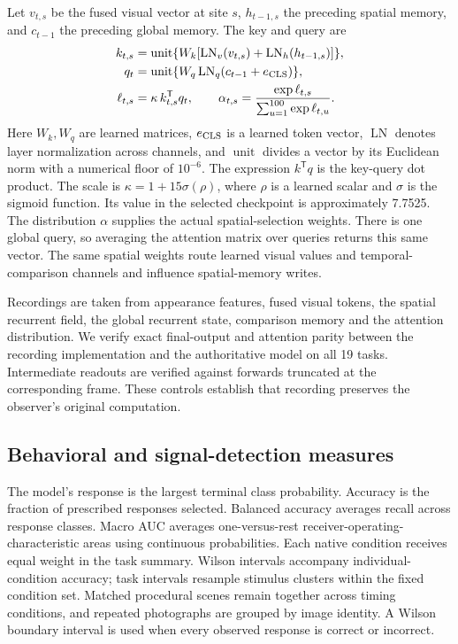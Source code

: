 \documentclass[11pt]{article}
\begin{document}
Let $v_{t,s}$ be the fused visual vector at site $s$, $h_{t-1,s}$ the preceding spatial memory, and $c_{t-1}$ the preceding global memory. The key and query are
\begin{align}
 k_{t,s}&=\operatorname{unit}\{W_k[\operatorname{LN}_v(v_{t,s})+\operatorname{LN}_h(h_{t-1,s})]\},\\
 q_t&=\operatorname{unit}\{W_q\operatorname{LN}_q(c_{t-1}+e_{\rm CLS})\},\\
 \ell_{t,s}&=\kappa\,k_{t,s}^{\mathsf T}q_t,\qquad
 \alpha_{t,s}=\frac{\exp\ell_{t,s}}{\sum_{u=1}^{100}\exp\ell_{t,u}}.
\end{align}
Here $W_k,W_q$ are learned matrices, $e_{\rm CLS}$ is a learned token vector, $\operatorname{LN}$ denotes layer normalization across channels, and $\operatorname{unit}$ divides a vector by its Euclidean norm with a numerical floor of $10^{-6}$. The expression $k^{\mathsf T}q$ is the key-query dot product. The scale is $\kappa=1+15\sigma(\rho)$, where $\rho$ is a learned scalar and $\sigma$ is the sigmoid function. Its value in the selected checkpoint is approximately 7.7525. The distribution $\alpha$ supplies the actual spatial-selection weights. There is one global query, so averaging the attention matrix over queries returns this same vector. The same spatial weights route learned visual values and temporal-comparison channels and influence spatial-memory writes.

Recordings are taken from appearance features, fused visual tokens, the spatial recurrent field, the global recurrent state, comparison memory and the attention distribution. We verify exact final-output and attention parity between the recording implementation and the authoritative model on all 19 tasks. Intermediate readouts are verified against forwards truncated at the corresponding frame. These controls establish that recording preserves the observer's original computation.

\subsection{Behavioral and signal-detection measures}
The model's response is the largest terminal class probability. Accuracy is the fraction of prescribed responses selected. Balanced accuracy averages recall across response classes. Macro AUC averages one-versus-rest receiver-operating-characteristic areas using continuous probabilities. Each native condition receives equal weight in the task summary. Wilson intervals accompany individual-condition accuracy; task intervals resample stimulus clusters within the fixed condition set. Matched procedural scenes remain together across timing conditions, and repeated photographs are grouped by image identity. A Wilson boundary interval is used when every observed response is correct or incorrect.
\end{document}
